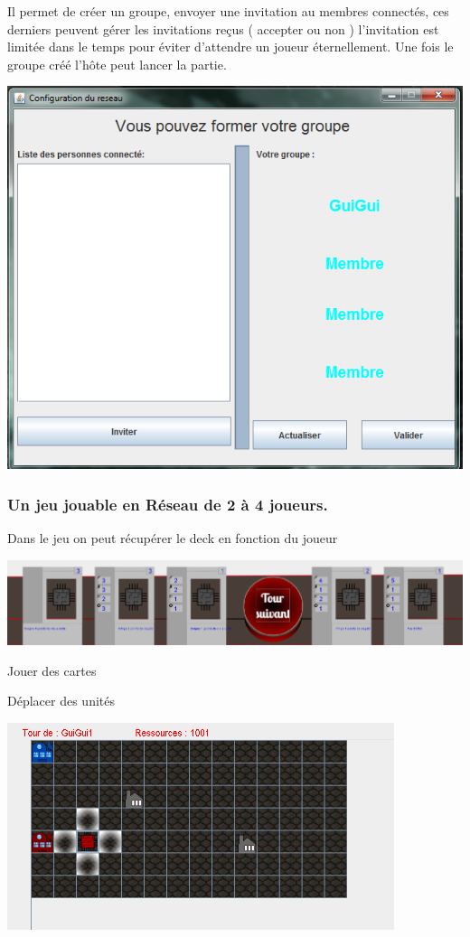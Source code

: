 \documentclass[a4paper,11pt]{report}
\begin{document}
	Il permet de créer un groupe, envoyer une invitation au membres connectés, ces derniers peuvent gérer les invitations reçus ( accepter ou non ) l'invitation est limitée dans le temps pour éviter d'attendre un joueur éternellement. Une fois le groupe créé l'hôte peut lancer la partie.   
	
	
	\begin{center}
	\includegraphics[scale=0.5]{Assets/connection3.png} 
	\end{center}
	
	\subsubsection{Un jeu jouable en Réseau de 2 à 4 joueurs.}
	
	Dans le jeu on peut récupérer le deck en fonction du joueur\\
	\begin{center}
	\includegraphics[scale=0.3]{Assets/mainJoueur.png} 
	\end{center}
	
	 Jouer des cartes
	
	 Déplacer des unités
	 \begin{center}
	\includegraphics[scale=1]{Assets/UniteeSelectMove.png} 
	\end{center}
	 
\end{document}
